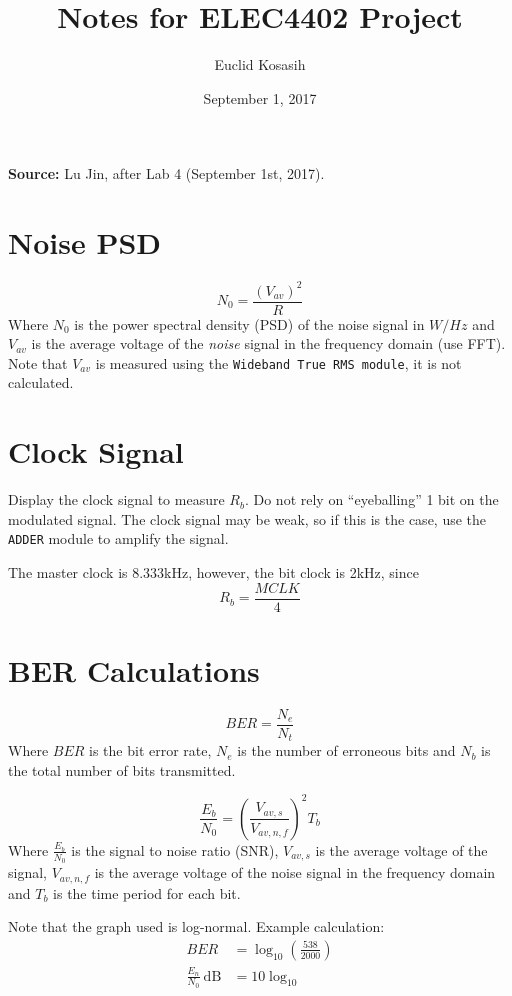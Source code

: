 \documentclass[a4paper]{article}
\author{Euclid Kosasih}
\date{September 1, 2017}
\title{Notes for ELEC4402 Project}
\begin{document}
\maketitle

\textbf{Source: } Lu Jin, after Lab 4 (September 1st, 2017).

\section{Noise PSD}
\begin{equation}
	N_0 = \frac{(V_{av})^2}{R}
\end{equation}
Where $N_0$ is the power spectral density (PSD) of the noise signal in $W/Hz$ and $V_{av}$ is the average voltage of the \textit{noise} signal in the frequency domain (use FFT). Note that $V_{av}$ is measured using the \texttt{Wideband True RMS module}, it is not calculated.

\section{Clock Signal}
Display the clock signal to measure $R_b$. Do not rely on ``eyeballing'' 1 bit on the modulated signal. The clock signal may be weak, so if this is the case, use the \texttt{ADDER} module to amplify the signal. 

The master clock is 8.333kHz, however, the bit clock is 2kHz, since
\begin{equation}
	R_b = \frac{MCLK}{4}
\end{equation}

\section{BER Calculations}
\begin{equation}
	BER = \frac{N_e}{N_t}
\end{equation}
Where $BER$ is the bit error rate, $N_e$ is the number of erroneous bits and $N_b$ is the total number of bits transmitted.

\begin{equation}
	\frac{E_b}{N_0} = \left(\frac{V_{av,s}}{V_{av,n,f}}\right)^2T_b
\end{equation}
Where $\frac{E_b}{N_0}$ is the signal to noise ratio (SNR), $V_{av,s}$ is the average voltage of the signal, $V_{av,n,f}$ is the average voltage of the noise signal in the frequency domain and $T_b$ is the time period for each bit.

Note that the graph used is log-normal. Example calculation:
\begin{align}
	BER &= \log_{10}{\left(\frac{538}{2000}\right)}\\
	\frac{E_n}{N_0}\ \mathrm{dB} &= 10\log_{10}
\end{align}
\end{document}
